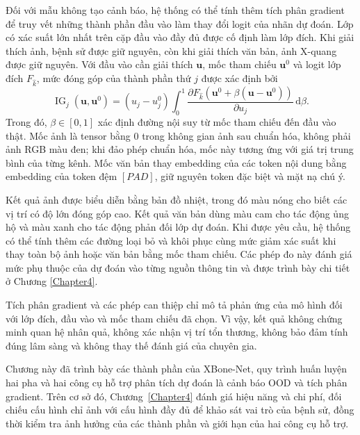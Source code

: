 Đối với mẫu không tạo cảnh báo, hệ thống có thể tính thêm tích phân gradient \cite{Sundararajan2017IntegratedGradients} để truy vết những thành phần đầu vào làm thay đổi logit của nhãn dự đoán. Lớp có xác suất lớn nhất trên cặp đầu vào đầy đủ được cố định làm lớp đích. Khi giải thích ảnh, bệnh sử được giữ nguyên, còn khi giải thích văn bản, ảnh X-quang được giữ nguyên. Với đầu vào cần giải thích $\boldsymbol{u}$, mốc tham chiếu $\boldsymbol{u}^{0}$ và logit lớp đích $F_{\widehat{k}}$, mức đóng góp của thành phần thứ $j$ được xác định bởi
\begin{equation}
\operatorname{IG}_{j}
\!\left(\boldsymbol{u},\boldsymbol{u}^{0}\right)
=
\left(u_j-u_j^{0}\right)
\int_{0}^{1}
\frac{\partial F_{\widehat{k}}
\!\left(
\boldsymbol{u}^{0}
+\beta\left(\boldsymbol{u}-\boldsymbol{u}^{0}\right)
\right)}
{\partial u_j}
\,\mathrm{d}\beta.
\label{eq:ch3_integrated_gradients}
\end{equation}
Trong đó, $\beta\in[0,1]$ xác định đường nội suy từ mốc tham chiếu đến đầu vào thật. Mốc ảnh là tensor bằng 0 trong không gian ảnh sau chuẩn hóa, không phải ảnh RGB màu đen; khi đảo phép chuẩn hóa, mốc này tương ứng với giá trị trung bình của từng kênh. Mốc văn bản thay embedding của các token nội dung bằng embedding của token đệm $[PAD]$, giữ nguyên token đặc biệt và mặt nạ chú ý.

Kết quả ảnh được biểu diễn bằng bản đồ nhiệt, trong đó màu nóng cho biết các vị trí có độ lớn đóng góp cao. Kết quả văn bản dùng màu cam cho tác động ủng hộ và màu xanh cho tác động phản đối lớp dự đoán. Khi được yêu cầu, hệ thống có thể tính thêm các đường loại bỏ và khôi phục cùng mức giảm xác suất khi thay toàn bộ ảnh hoặc văn bản bằng mốc tham chiếu. Các phép đo này đánh giá mức phụ thuộc của dự đoán vào từng nguồn thông tin và được trình bày chi tiết ở Chương \ref{Chapter4}.

Tích phân gradient và các phép can thiệp chỉ mô tả phản ứng của mô hình đối với lớp đích, đầu vào và mốc tham chiếu đã chọn. Vì vậy, kết quả không chứng minh quan hệ nhân quả, không xác nhận vị trí tổn thương, không bảo đảm tính đúng lâm sàng và không thay thế đánh giá của chuyên gia.

Chương này đã trình bày các thành phần của XBone-Net, quy trình huấn luyện hai pha và hai công cụ hỗ trợ phân tích dự đoán là cảnh báo OOD và tích phân gradient. Trên cơ sở đó, Chương~\ref{Chapter4} đánh giá hiệu năng và chi phí, đối chiếu cấu hình chỉ ảnh với cấu hình đầy đủ để khảo sát vai trò của bệnh sử, đồng thời kiểm tra ảnh hưởng của các thành phần và giới hạn của hai công cụ hỗ trợ.
